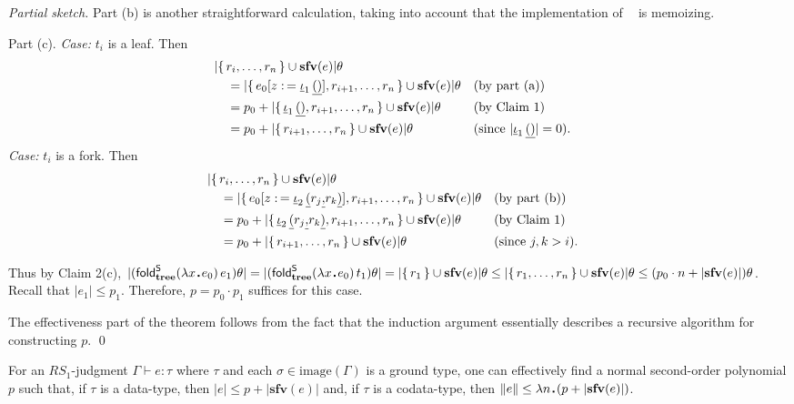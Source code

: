 \documentclass[envcountsame]{llncs}
\newcommand{\sfv}{\ensuremath{\mathbf{sfv}}}\newcommand{\ssize}[1]{\Vert #1\Vert}
\newcommand{\safe}[1]{#1^{\mathsf{S}}}
\newcommand{\folds}[1]{\mathop{\safe{\mathsf{fold}}_{#1}}}
\newcommand{\type}[1]{\ensuremath{\mathbf{#1}}\xspace}
\newcommand{\Tree}{\type{tree}}
\newcommand{\asize}[1]{\ensuremath{\mathopen{|}#1\mathclose{|}}\xspace}
\newcommand{\osize}[1]{\ensuremath{\mathopen{\Vert}#1\mathclose{\Vert}}}
\newcommand{\ustrut}{\rule[-.18\baselineskip]{0pt}{0pt}}
\newcommand{\upair}[2]{\underline{(}#1\underline{\ustrut,}#2\underline{)}}
\newcommand{\uiota}{\mathop{\underline{\iota}}\nolimits}
\newcommand{\uep}{\underline{()}}
\newcommand{\RSi}{\mathit{RS_1}}
\renewcommand{\gets}{\ensuremath{\mathrel{\colon=}}\xspace}
\newcommand{\image}{\mathrm{image}}
\newcommand{\set}[1]{\{\,#1\,\}}
\newcommand{\entails}{\vdash}
\newcommand{\sqdot}{\rule{0.5mm}{0.5mm}}
\newcommand{\lam}[1]{\lambda #1\,\sqdot\,}
\newcommand{\of}{\colon}
\renewcommand{\colon}{\mathpunct{:}}
\newcommand{\Quad}[1]{\hspace*{#1em}}
\begin{document}
\begin{proof}[Partial sketch]
Part (b) is another straightforward calculation, taking into 
account that the implementation of $\folds\Tree$ is memoizing.

Part (c). \emph{Case:} $t_i$ is a leaf. 
Then
\begin{align*}
\lefteqn{\asize{\set{r_i,\dots,r_n}\cup\sfv(e)}\theta }\\
& \Quad1= 
\asize{\set{e_0[z\gets \uiota_1\uep] ,r_{i+1},\dots,r_n}\cup\sfv(e)}\theta
&& \hbox{(by part (a))}
\\
& \Quad1=  
p_0 + \asize{\set{\uiota_1\uep,r_{i+1},\dots,r_n}\cup\sfv(e)}\theta
&& \hbox{(by Claim 1)}
\\
& \Quad1= 
 p_0 + \asize{\set{r_{i+1},\dots,r_n}\cup\sfv(e)}\theta
 &&\hbox{(since $\asize{ \uiota_1\uep}=0$).}
\end{align*}
\emph{Case:} $t_i$ is a fork. 
Then
\begin{align*}
\lefteqn{\asize{\set{r_i,\dots,r_n}\cup\sfv(e)}\theta }
\\
& \Quad1=  
\asize{\set{e_0[z\gets \uiota_2\upair{r_j}{r_k}] ,r_{i+1},\dots,r_n}\cup\sfv(e)}\theta
&& \hbox{(by part (b))}
\\
& \Quad1= 
 p_0 + \asize{\set{\uiota_2\upair{r_j}{r_k},r_{i+1},\dots,r_n}\cup\sfv(e)}\theta
&& \hbox{(by Claim 1)}
\\
& \Quad1=  
p_0 + \asize{\set{r_{i+1},\dots,r_n}\cup\sfv(e)}\theta
&& \hbox{(since $j,k>i$)}.
\end{align*}

Thus by Claim 2(c), $\asize{(\folds{\Tree} (\lam{x}e_0)\,e_1)\theta }
= \asize{(\folds{\Tree} (\lam{x}e_0)\,t_1)\theta }
= \asize{\set{r_1}\cup\sfv(e)}\theta
\leq \asize{\set{r_1,\dots,r_n}\cup\sfv(e)}\theta
\leq (p_0\cdot n + \asize{\sfv(e)})\theta$.
Recall that $\asize{e_1}\leq p_1$.
Therefore, $p=p_0\cdot p_1$ suffices for this case.

The effectiveness part of the theorem follows from the fact
that the induction argument essentially describes a recursive 
algorithm for constructing $p$.  \qed
\end{proof}





\begin{theorem}
  For an $\RSi$-judgment $\Gamma\entails e\of \tau$ where
  $\tau$ and each $\sigma\in\image(\Gamma)$ is a ground type, one
  can effectively find a normal second-order polynomial $p$ such
  that, if $\tau$ is a data-type, then $\asize{e} \leq p +
  \asize{\sfv(e)}$ and, if $\tau$ is a codata-type, then
  $\osize{e} \leq \lam{n}(p + \asize{\sfv(e)})$.
\end{theorem}  
\end{document}
